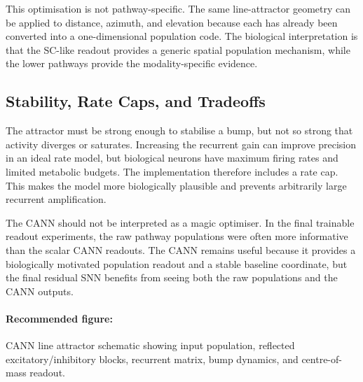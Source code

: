 This optimisation is not pathway-specific. The same line-attractor geometry can be applied to distance, azimuth, and elevation because each has already been converted into a one-dimensional population code. The biological interpretation is that the SC-like readout provides a generic spatial population mechanism, while the lower pathways provide the modality-specific evidence.



\subsection{Stability, Rate Caps, and Tradeoffs}

The attractor must be strong enough to stabilise a bump, but not so strong that activity diverges or saturates. Increasing the recurrent gain can improve precision in an ideal rate model, but biological neurons have maximum firing rates and limited metabolic budgets. The implementation therefore includes a rate cap. This makes the model more biologically plausible and prevents arbitrarily large recurrent amplification.

The CANN should not be interpreted as a magic optimiser. In the final trainable readout experiments, the raw pathway populations were often more informative than the scalar CANN readouts. The CANN remains useful because it provides a biologically motivated population readout and a stable baseline coordinate, but the final residual SNN benefits from seeing both the raw populations and the CANN outputs.

\paragraph{Recommended figure:} CANN line attractor schematic showing input population, reflected excitatory/inhibitory blocks, recurrent matrix, bump dynamics, and centre-of-mass readout.


